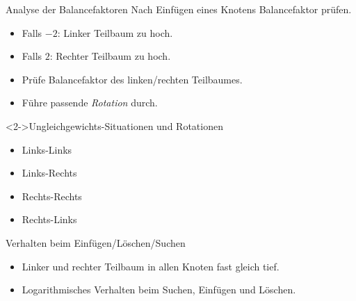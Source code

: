\begin{frame}
    \begin{block}{Analyse der Balancefaktoren}
        Nach Einfügen eines Knotens Balancefaktor prüfen.
        \begin{itemize}
            \item Falls $-2$: Linker Teilbaum zu hoch.
            \item Falls $2$: Rechter Teilbaum zu hoch.
            \item Prüfe Balancefaktor des linken/rechten Teilbaumes.
            \item Führe passende \emph{Rotation} durch.
        \end{itemize}
    \end{block}
    \begin{block}<2->{Ungleichgewichts-Situationen und Rotationen}
        \begin{itemize}
            \item Links-Links
            \item Links-Rechts
            \item Rechts-Rechts
            \item Rechts-Links
        \end{itemize}
    \end{block}
\end{frame}

\begin{frame}    
    \begin{block}{Verhalten beim Einfügen/Löschen/Suchen}
        \begin{itemize}
            \item Linker und rechter Teilbaum in allen Knoten fast gleich tief.
            \item Logarithmisches Verhalten beim Suchen, Einfügen und Löschen.
        \end{itemize}
    \end{block}
\end{frame}
